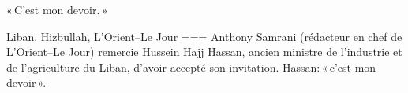 « C’est mon devoir. »

Liban, Hizbullah, L’Orient–Le Jour
===
Anthony Samrani (rédacteur en chef de L’Orient–Le Jour) remercie Hussein Hajj Hassan, ancien ministre de l’industrie et de l’agriculture du Liban, d’avoir accepté son invitation. Hassan: « c’est mon devoir ».

\nocite{hassan2022}